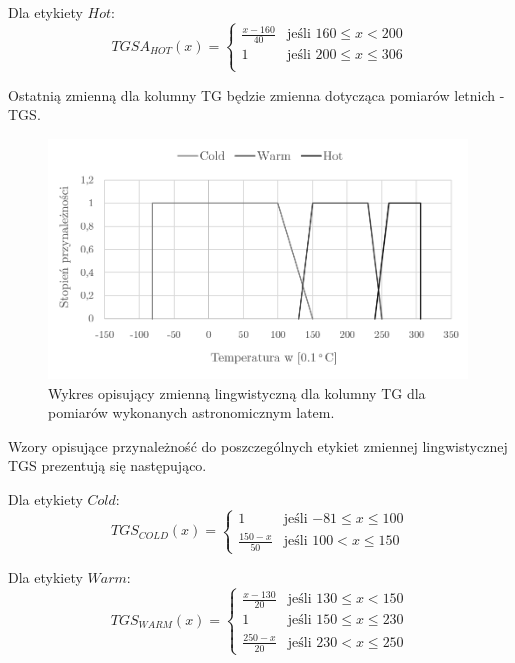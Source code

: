 \documentclass{classrep}
\begin{document}
Dla etykiety $Hot$:
\begin{equation}
{TGSA}_{HOT}(x)= \left\{ \begin{array}{ll}
\frac{x-160}{40} & \textrm{jeśli $160 \leq x < 200$} \\
1 			 & \textrm{jeśli $200 \leq x \leq 306$} \\
\end{array} \right.
\end{equation}\newline


Ostatnią zmienną dla kolumny TG będzie zmienna dotycząca pomiarów letnich - TGS.
\begin{figure}[H]
	\centering
	\includegraphics[width=0.99\textwidth]{Pictures/TermsCharts/TG_L.png}
	\caption{Wykres opisujący zmienną lingwistyczną dla kolumny TG dla pomiarów wykonanych astronomicznym latem.}
\end{figure}

Wzory opisujące przynależność do poszczególnych etykiet zmiennej lingwistycznej TGS prezentują się następująco. \newline

Dla etykiety $Cold$:
\begin{equation}
{TGS}_{COLD}(x)= \left\{ \begin{array}{ll}
1 			& \textrm{jeśli $-81 \leq x \leq 100$} \\
\frac{150-x}{50}& \textrm{jeśli $100 < x \leq 150$}
\end{array} \right.
\end{equation}

Dla etykiety $Warm$:
\begin{equation}
{TGS}_{WARM}(x)= \left\{ \begin{array}{ll}
\frac{x-130}{20} & \textrm{jeśli $130 \leq x < 150$} \\
1 			 & \textrm{jeśli $150 \leq x \leq 230$} \\
\frac{250-x}{20} & \textrm{jeśli $230 < x \leq 250$}
\end{array} \right.
\end{equation}
\end{document}
